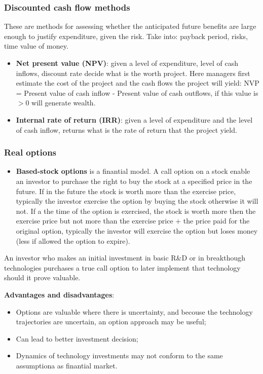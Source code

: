 \documentclass[12pt]{article}
\begin{document}
\subsubsection{Discounted cash flow methods}
These are methods for assessing whether the anticipated future benefits are large enough to justify expenditure, given the risk.
Take into: payback period, risks, time value of money.
\begin{itemize}
    \item \textbf{Net present value (NPV)}: given a level of expenditure, level of cash inflows, discount rate decide what is the worth project.
    Here managers first estimate the cost of the project and the cash flows the project will yield: NVP = Present value of cash inflow - Present value of cash outflows, if this value is $>0$ will generate wealth.
    \item \textbf{Internal rate of return (IRR)}: given a level of expenditure and the level of cash inflow, returns what is the rate of return that the project yield.
\end{itemize}
\subsubsection{Real options}
\begin{itemize}
    \item \textbf{Based-stock options} is a finantial model.
    A call option on a stock enable an investor to purchase the right to buy the stock at a specified price in the future.
    If in the future the stock is worth more than the exercise price, typically the investor exercise the option by buying the stock otherwise it will not.
    If a the time of the option is exercised, the stock is worth more then the exercise price but not more than the exercise price + the price paid for the original option, typically the investor will exercise the option but loses money (less if allowed the option to expire). 
\end{itemize}
An investor who makes an initial investment in basic R\&D or in breakthough technologies purchases a true call option to later implement that technology should it prove valuable.

\textbf{Advantages and disadvantages}:
\begin{itemize}
    \item Options are valuable where there is uncertainty, and becouse the technology trajectories are uncertain, an option approach may be useful;
    \item Can lead to better investment decision;
    \item Dynamics of technology investments may not conform to the same assumptiona as finantial market.
\end{itemize}
\end{document}
